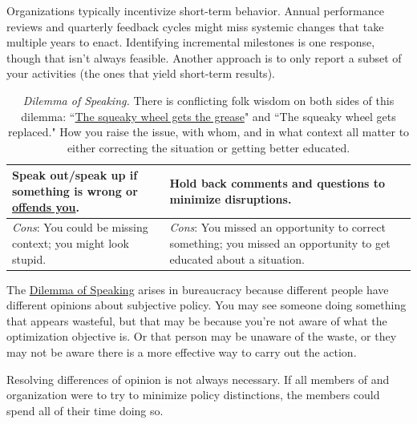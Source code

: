 Organizations typically incentivize short-term behavior. Annual performance reviews and quarterly feedback cycles might miss systemic changes that take multiple years to enact. Identifying incremental milestones is one response, though that isn't always feasible. Another approach is to only report a subset of your activities (the ones that yield short-term results). 

\begin{center}
\begin{table}[H] %
\begin{tabular}{ | m{\dilemmatablewidth}| m{\dilemmatablewidth} | } 
  \hline
  \textbf{Speak out/speak up if something is wrong or \href{https://en.wikipedia.org/wiki/Moral_injury}{offends you}.} &
  \textbf{Hold back comments and questions to minimize disruptions.} \\
  \hline
  \textit{Cons}: You could be missing context; you might look stupid. & 
  \textit{Cons}: You missed an opportunity to correct something; you missed an opportunity to get educated about a situation. \\
  \hline
\end{tabular}
\caption{
\textit{Dilemma of Speaking.}
There is conflicting folk wisdom on both sides of this dilemma: 
``\href{https://en.wikipedia.org/wiki/The_squeaky_wheel_gets_the_grease}{The squeaky wheel gets the grease}" 
and 
``The squeaky wheel gets replaced." 
How you raise the issue, with whom, and in what context all matter to either correcting the situation or getting better educated.
}
\label{table:speak-up-or-hold-back}
\end{table}
\end{center}

The \href{table:speak-up-or-hold-back}{Dilemma of Speaking} arises in bureaucracy because different people have different opinions about subjective policy. You may see someone doing something that appears wasteful, but that may be because you're not aware of what the optimization objective is. Or that person may be unaware of the waste, or they may not be aware there is a more effective way to carry out the action. 

Resolving differences of opinion is not always necessary. If all members of and organization were to try to minimize policy distinctions, the members could spend all of their time doing so. 

